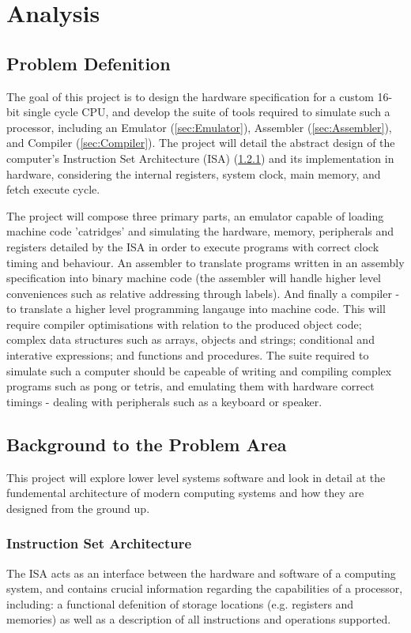 \section{Analysis}
\subsection{Problem Defenition}
The goal of this project is to design the hardware specification for a custom 16-bit single cycle CPU, and develop the suite of tools required to simulate such a processor, including an Emulator (\ref{sec:Emulator}), Assembler (\ref{sec:Assembler}), and Compiler (\ref{sec:Compiler}). The project will detail the abstract design of the computer’s Instruction Set Architecture (ISA) (\ref{sec:ISA}) and its implementation in hardware, considering the internal registers, system clock, main memory, and fetch execute cycle.

The project will compose three primary parts, an emulator capable of loading machine code 'catridges' and simulating the hardware, memory, peripherals and registers detailed by the ISA in order to execute programs with correct clock timing and behaviour. An assembler to translate programs written in an assembly specification into binary machine code (the assembler will handle higher level conveniences such as relative addressing through labels). And finally a compiler - to translate a higher level programming langauge into machine code. This will require compiler optimisations with relation to the produced object code; complex data structures such as arrays, objects and strings; conditional and interative expressions; and functions and procedures. The suite required to simulate such a computer should be capeable of writing and compiling complex programs such as pong or tetris, and emulating them with hardware correct timings - dealing with peripherals such as a keyboard or speaker.

\subsection{Background to the Problem Area}
This project will explore lower level systems software and look in detail at the fundemental architecture of modern computing systems and how they are designed from the ground up.

\subsubsection{Instruction Set Architecture}
\label{sec:ISA}
The ISA acts as an interface between the hardware and software of a computing system, and contains crucial information regarding the capabilities of a processor, including: a functional defenition of storage locations (e.g. registers and memories) as well as a description of all instructions and operations supported.

